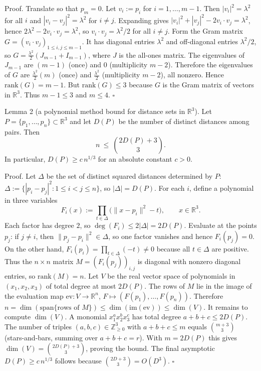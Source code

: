 Proof.
Translate so that $p_m=0$. Let $v_i:=p_i$ for $i=1,\ldots,m-1$. Then
$|v_i|^2=\lambda^2$ for all $i$ and $|v_i-v_j|^2=\lambda^2$ for $i\neq j$. Expanding gives
$|v_i|^2+|v_j|^2-2v_i\cdot v_j=\lambda^2$, hence $2\lambda^2-2v_i\cdot v_j=\lambda^2$, so
$v_i\cdot v_j=\lambda^2/2$ for all $i\neq j$.
Form the Gram matrix $G=(v_i\cdot v_j)_{1\le i,j\le m-1}$. It has diagonal entries $\lambda^2$ and off-diagonal entries $\lambda^2/2$, so
$G=\frac{\lambda^2}{2}(J_{m-1}+I_{m-1})$, where $J$ is the all-ones matrix. The eigenvalues of $J_{m-1}$ are $(m-1)$ (once) and $0$ (multiplicity $m-2$).
Therefore the eigenvalues of $G$ are $\frac{\lambda^2}{2}(m)$ (once) and $\frac{\lambda^2}{2}$ (multiplicity $m-2$), all nonzero. Hence $\mathrm{rank}(G)=m-1$.
But $\mathrm{rank}(G)\le 3$ because $G$ is the Gram matrix of vectors in $\mathbb{R}^3$. Thus $m-1\le 3$ and $m\le 4$. $\square$

Lemma 2 (a polynomial method bound for distance sets in $\mathbb{R}^3$).
Let $P=\{p_1,\ldots,p_n\}\subset\mathbb{R}^3$ and let $D(P)$ be the number of distinct distances among pairs.
Then
\[
n\ \le\ \binom{2D(P)+3}{3}.
\]
In particular, $D(P)\ge c\,n^{1/3}$ for an absolute constant $c>0$.

Proof.
Let $\Delta$ be the set of distinct squared distances determined by $P$:
$\Delta:=\{|p_i-p_j|^2:1\le i<j\le n\}$, so $|\Delta|=D(P)$.
For each $i$, define a polynomial in three variables
\[
F_i(x):=\prod_{t\in\Delta}\bigl(\|x-p_i\|^2-t\bigr),\qquad x\in\mathbb{R}^3.
\]
Each factor has degree $2$, so $\deg(F_i)\le 2|\Delta|=2D(P)$.
Evaluate at the points $p_j$: if $j\neq i$, then $\|p_j-p_i\|^2\in\Delta$, so one factor vanishes and hence $F_i(p_j)=0$.
On the other hand, $F_i(p_i)=\prod_{t\in\Delta}(-t)\neq 0$ because all $t\in\Delta$ are positive.
Thus the $n\times n$ matrix $M=(F_i(p_j))_{i,j}$ is diagonal with nonzero diagonal entries, so $\mathrm{rank}(M)=n$.
Let $V$ be the real vector space of polynomials in $(x_1,x_2,x_3)$ of total degree at most $2D(P)$.
The rows of $M$ lie in the image of the evaluation map $\mathrm{ev}:V\to\mathbb{R}^n$, $F\mapsto (F(p_1),\ldots,F(p_n))$. Therefore
$n=\dim(\mathrm{span}\{\text{rows of }M\})\le \dim(\mathrm{im}(\mathrm{ev}))\le \dim(V)$.
It remains to compute $\dim(V)$. A monomial $x_1^{a}x_2^{b}x_3^{c}$ has total degree $a+b+c\le 2D(P)$.
The number of triples $(a,b,c)\in\mathbb{Z}_{\ge 0}^3$ with $a+b+c\le m$ equals $\binom{m+3}{3}$ (stars-and-bars, summing over $a+b+c=r$).
With $m=2D(P)$ this gives $\dim(V)=\binom{2D(P)+3}{3}$, proving the bound.
The final asymptotic $D(P)\ge c\,n^{1/3}$ follows because $\binom{2D+3}{3}=O(D^3)$. $\square$

